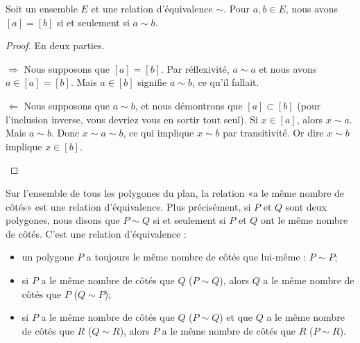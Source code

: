 \begin{lemma}
	Soit un ensemble \( E\) et une relation d'équivalence \( \sim\). Pour \( a,b\in E\), nous avons \( [a]=[b]\) si et seulement si \( a\sim b\).
\end{lemma}

\begin{proof}
	En deux parties.
	\begin{subproof}
		\item[\( \Rightarrow\)]
		Nous supposons que \( [a]=[b]\). Par réflexivité, \( a\sim a\) et nous avons \( a\in [a]=[b]\). Mais \( a\in [b]\) signifie \( a\sim b\), ce qu'il fallait.
		\item[\( \Leftarrow\)]
		Nous supposons que \( a\sim b\), et nous démontrons que \( [a]\subset [b]\) (pour l'inclusion inverse, vous devriez vous en sortir tout seul). Si \( x\in [a]\), alors \( x\sim a\). Mais \( a\sim b\). Donc \( x\sim a\sim b\), ce qui implique \( x\sim b\) par transitivité. Or dire \( x\sim b\) implique \( x\in [b]\).
	\end{subproof}
\end{proof}

\begin{example}
	Sur l'ensemble de tous les polygones du plan, la relation «a le même nombre de côtés» est une relation d'équivalence. Plus précisément, si \( P\) et \( Q\) sont deux polygones, nous disons que \( P\sim Q\) si et seulement si \( P\) et \( Q\) ont le même nombre de côtés. C'est une relation d'équivalence :
	\begin{itemize}
		\item
		      un polygone \( P\) a toujours le même nombre de côtés que lui-même : \( P\sim P\);
		\item
		      si \( P\) a le même nombre de côtés que \( Q\) (\( P\sim Q\)), alors \( Q\) a le même nombre de côtés que \( P\) (\( Q\sim P\));
		\item
		      si \( P\) a le même nombre de côtés que \( Q\) (\( P\sim Q\)) et que \( Q\) a le même nombre de côtés que \( R\) (\( Q\sim R\)), alors \( P\) a le même nombre de côtés que \( R\) (\( P\sim R\)).
	\end{itemize}
\end{example}

